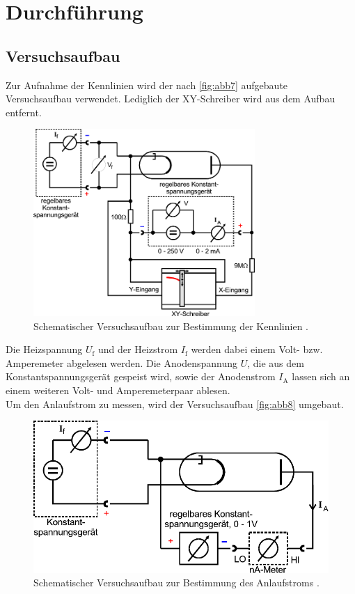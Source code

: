 \section{Durchführung}
\label{sec:Durchführung}


\subsection{Versuchsaufbau}

Zur Aufnahme der Kennlinien wird der nach \autoref{fig:abb7} aufgebaute Versuchsaufbau verwendet. 
Lediglich der XY-Schreiber wird aus dem Aufbau entfernt.

\begin{figure}[H]
    \centering
    \includegraphics[width = 0.75\textwidth]{figures/Abb7.pdf}
    \caption{Schematischer Versuchsaufbau zur Bestimmung der Kennlinien \cite{ap09}.}
    \label{fig:abb7}
\end{figure}

Die Heizspannung $U_\text{f}$ und der Heizstrom $I_\text{f}$ werden dabei einem Volt- bzw. Amperemeter abgelesen werden.
Die Anodenspannung $U$, die aus dem Konstantspannungsgerät gespeist wird, sowie der Anodenstrom $I_\text{A}$ lassen sich an einem weiteren Volt- und Amperemeterpaar ablesen. \\

Um den Anlaufstrom zu messen, wird der Versuchsaufbau \autoref{fig:abb8} umgebaut.

\begin{figure}[H]
    \centering
    \includegraphics{figures/Abb8.pdf}
    \caption{Schematischer Versuchsaufbau zur Bestimmung des Anlaufstroms \citeyear{ap09}.}
    \label{fig:abb8}
\end{figure}


